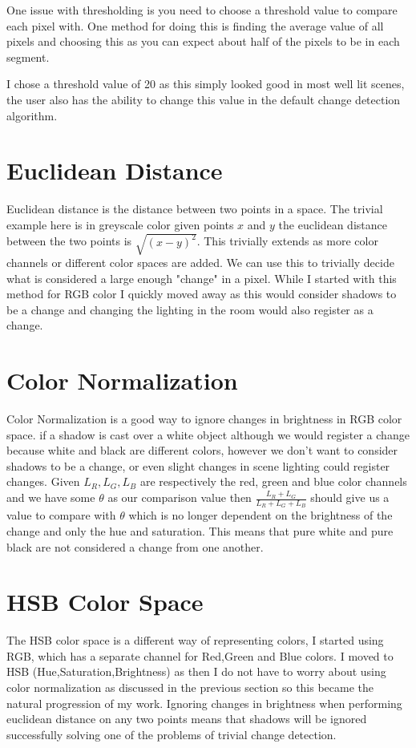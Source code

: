 \documentclass[a4paper]{report}
\begin{document}
One issue with thresholding is you need to choose a threshold value to compare each pixel with. One method for doing this is finding the average value of all pixels and choosing this as you can expect about half of the pixels to be in each segment.

I chose a threshold value of 20 as this simply looked good in most well lit scenes, the user also has the ability to change this value in the default change detection algorithm.
\section{Euclidean Distance}
Euclidean distance is the distance between two points in a space. The trivial example here is in greyscale color given points $x$ and $y$ the euclidean distance between the two points is $\sqrt{(x-y)^2}$. This trivially extends as more color channels or different color spaces are added. We can use this to trivially decide what is considered a large enough "change" in a pixel. While I started with this method for RGB color I quickly moved away as this would consider shadows to be a change and changing the lighting in the room would also register as a change.

\section{Color Normalization}
Color Normalization is a good way to ignore changes in brightness in RGB color space. if a shadow is cast over a white object although we would register a change because white and black are different colors, however we don't want to consider shadows to be a change, or even slight changes in scene lighting could register changes. Given $L_R,L_G,L_B$ are respectively the red, green and blue color channels and we have some $\theta$ as our comparison value then $\frac{L_R + L_G}{L_R + L_G + L_B}$ should give us a value to compare with $\theta$ which is no longer dependent on the brightness of the change and only the hue and saturation. This means that pure white and pure black are not considered a change from one another.

\section{HSB Color Space}
The HSB color space is a different way of representing colors, I started using RGB, which has a separate channel for Red,Green and Blue colors. I moved to HSB (Hue,Saturation,Brightness) as then I do not have to worry about using color normalization as discussed in the previous section so this became the natural progression of my work. Ignoring changes in brightness when performing euclidean distance on any two points means that shadows will be ignored successfully solving one of the problems of trivial change detection.
\end{document}
